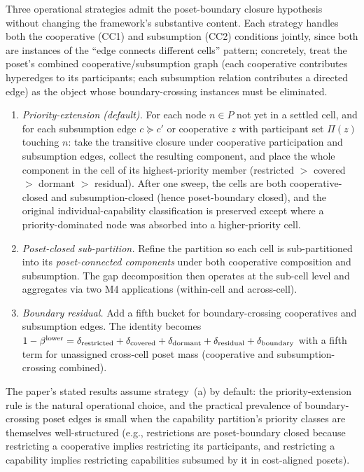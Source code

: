\begin{remark}
\label{rem:cell_cooperative_closure}
Three operational strategies admit the poset-boundary closure
hypothesis without changing the framework's substantive content.
Each strategy handles both the cooperative (CC1) and subsumption
(CC2) conditions jointly, since both are instances of the
``edge connects different cells'' pattern; concretely, treat the
poset's combined cooperative/subsumption graph (each cooperative
contributes hyperedges to its participants; each subsumption
relation contributes a directed edge) as the object whose
boundary-crossing instances must be eliminated.
\begin{enumerate}
\item[(a)] \emph{Priority-extension (default).}  For each node
  $n \in P$ not yet in a settled cell, and for each subsumption
  edge $c \succeq c'$ or cooperative $z$ with participant set
  $\Pi(z)$ touching $n$: take the transitive closure under
  cooperative participation and subsumption edges, collect the
  resulting component, and place the whole component in the
  cell of its highest-priority member
  (restricted $>$ covered $>$ dormant $>$ residual).  After one
  sweep, the cells are both cooperative-closed and
  subsumption-closed (hence poset-boundary closed), and the
  original individual-capability classification is preserved
  except where a priority-dominated node was absorbed into a
  higher-priority cell.
\item[(b)] \emph{Poset-closed sub-partition.}  Refine the
  partition so each cell is sub-partitioned into its
  \emph{poset-connected components} under both cooperative
  composition and subsumption.  The gap decomposition then
  operates at the sub-cell level and aggregates via two M4
  applications (within-cell and across-cell).
\item[(c)] \emph{Boundary residual.}  Add a fifth bucket for
  boundary-crossing cooperatives and subsumption edges.  The
  identity becomes
  $1 - \beta^{\mathrm{lower}} = \delta_{\mathrm{restricted}} + \delta_{\mathrm{covered}}
  + \delta_{\mathrm{dormant}} + \delta_{\mathrm{residual}}
  + \delta_{\mathrm{boundary}}$ with a fifth term for
  unassigned cross-cell poset mass (cooperative and
  subsumption-crossing combined).
\end{enumerate}
The paper's stated results assume strategy~(a) by default: the
priority-extension rule is the natural operational choice, and
the practical prevalence of boundary-crossing poset edges is
small when the capability partition's priority classes are
themselves well-structured (e.g., restrictions are
poset-boundary closed because restricting a cooperative implies
restricting its participants, and restricting a capability
implies restricting capabilities subsumed by it in cost-aligned
posets).
\end{remark}

